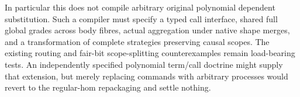 \documentclass{article}
\begin{document}
In particular this does not compile arbitrary original polynomial dependent
substitution. Such a compiler must specify a typed call interface, shared
full global grades across body fibres, actual aggregation under native shape
merges, and a transformation of complete strategies preserving causal scopes.
The existing routing and fair-bit scope-splitting counterexamples remain
load-bearing tests. An independently specified polynomial term/call doctrine
might supply that extension, but merely replacing commands with arbitrary
processes would revert to the regular-hom repackaging and settle nothing.
\end{document}
